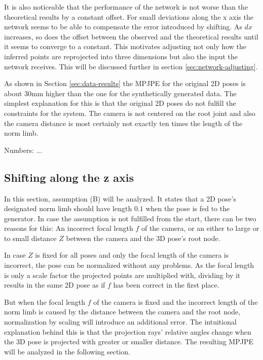 It is also noticeable that the performance of the network is not worse than the theoretical results by a constant offset.
For small deviations along the x axis the network seems to be able to compensate the error introduced by shifting.
As $dx$ increases, so does the offset between the observed and the theoretical results until it seems to converge to a constant.
This motivates adjusting not only how the inferred points are reprojected into three dimensions but also the input the network receives.
This will be discussed further in section \ref{sec:network-adjusting}.

As shown in Section \ref{sec:data-results} the MPJPE for the original 2D poses is about  30mm higher than the one for the synthetically generated data.
The simplest explanation for this is that the original 2D poses do not fulfill the constraints for the system.
The camera is not centered on the root joint and also the camera distance is most certainly not exactly ten times the length of the norm limb.

Numbers: ...
	
\subsection{Shifting along the z axis}
\label{sec:z-shift-error}

In this section, assumption (B) will be analyzed.
It states that a 2D pose's designated norm limb should have length $0.1$ when the pose is fed to the generator.
In case the assumption is not fulfilled from the start, there can be two reasons for this: 
An incorrect focal length $f$ of the camera, or an either to large or to small distance $Z$ between the camera and the 3D pose's root node.

In case $Z$ is fixed for all poses and only the focal length of the camera is incorrect, the pose can be normalized without any problems.
As the focal length is only a scale factor the projected points are multiplied with, dividing by it results in the same 2D pose as if $f$ has been correct in the first place.

But when the focal length $f$ of the camera is fixed and the incorrect length of the norm limb is caused by the distance between the camera and the root node, normalization by scaling will introduce an additional error.
The intuitional explanation behind this is that the projection rays' relative angles change when the 3D pose is projected with greater or smaller distance.
The resulting MPJPE will be analyzed in the following section.

